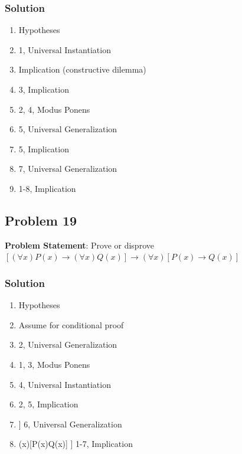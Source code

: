 \documentclass[12pt]{article}
\begin{document}
\subsubsection*{Solution}
\begin{enumerate}[left=0em,labelwidth=4em,align=left]
    \item[\( (\forall x)\lnot P(x) \)] \hfill Hypotheses
    \item[\( \lnot P(a) \)] \hfill 1, Universal Instantiation
    \item[\( P(a) \rightarrow Q(a) \)] \hfill Implication (constructive dilemma)
    \item[\( \lnot P(a) \lor Q(a) \)] \hfill 3, Implication
    \item[\( Q(a) \)] \hfill 2, 4, Modus Ponens
    \item[\( (\forall x) Q(x) \)] \hfill 5, Universal Generalization
    \item[\( P(a) \rightarrow Q(a) \)] \hfill 5, Implication
    \item[\( (\forall x)(P(x) \rightarrow Q(x)) \)] \hfill 7, Universal Generalization
    \item[\( (\forall x)\lnot P(x) \rightarrow (\forall x)(P(x) \rightarrow Q(x)) \)] \hfill 1-8, Implication
\end{enumerate}

\newpage
\subsection*{Problem 19}
\textbf{Problem Statement}: Prove or disprove \( [(\forall x)P(x) \rightarrow (\forall x)Q(x)]\rightarrow (\forall x)[P(x)\rightarrow Q(x)] \)

\subsubsection*{Solution}
\begin{enumerate}[left=0em,labelwidth=4em,align=left]
    \item[\( (\forall x)P(x) \rightarrow (\forall x)Q(x) \)] \hfill Hypotheses
    \item[\( P(a) \)] \hfill Assume for conditional proof
    \item[\( (\forall x)P(x) \)] \hfill 2, Universal Generalization
    \item[\( (\forall x)Q(x) \)] \hfill 1, 3, Modus Ponens
    \item[\( Q(a) \)] \hfill 4, Universal Instantiation
    \item[\( P(a) \rightarrow Q(a) \)] \hfill 2, 5, Implication
    \item[\( (\forall x)[P(x) \rightarrow Q(x)] \)] \hfill 6, Universal Generalization
    \item[\( [(\forall x)P(x) \rightarrow (\forall x)Q(x)]\rightarrow (\forall x)[P(x)\rightarrow Q(x)] \)] \hfill 1-7, Implication
\end{enumerate}
\end{document}
